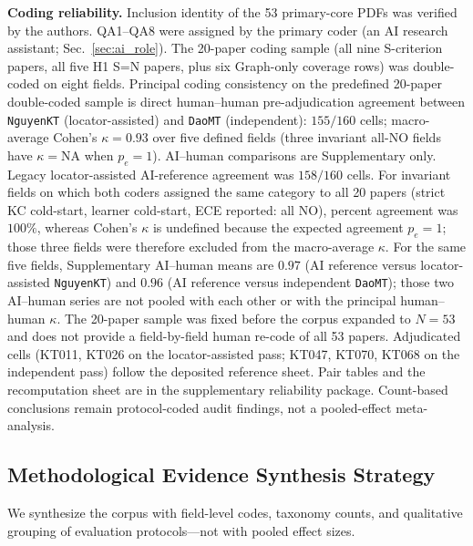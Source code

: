 \documentclass[lettersize,journal]{IEEEtran}
\begin{document}
\textbf{Coding reliability.} Inclusion identity of the 53 primary-core PDFs was verified by the authors. QA1--QA8 were assigned by the primary coder (an AI research assistant; Sec.~\ref{sec:ai_role}). The 20-paper coding sample (all nine S-criterion papers, all five H1 S=N papers, plus six Graph-only coverage rows) was double-coded on eight fields. Principal coding consistency on the predefined 20-paper double-coded sample is direct human--human pre-adjudication agreement between \texttt{NguyenKT} (locator-assisted) and \texttt{DaoMT} (independent): $155/160$ cells; macro-average Cohen's $\kappa=0.93$ over five defined fields (three invariant all-NO fields have $\kappa=\mathrm{NA}$ when $p_e=1$). AI--human comparisons are Supplementary only. Legacy locator-assisted AI-reference agreement was $158/160$ cells. For invariant fields on which both coders assigned the same category to all 20 papers (strict KC cold-start, learner cold-start, ECE reported: all NO), percent agreement was $100\%$, whereas Cohen's $\kappa$ is undefined because the expected agreement $p_e=1$; those three fields were therefore excluded from the macro-average $\kappa$. For the same five fields, Supplementary AI--human means are $0.97$ (AI reference versus locator-assisted \texttt{NguyenKT}) and $0.96$ (AI reference versus independent \texttt{DaoMT}); those two AI--human series are not pooled with each other or with the principal human--human $\kappa$. The 20-paper sample was fixed before the corpus expanded to $N=53$ and does not provide a field-by-field human re-code of all 53 papers. Adjudicated cells (KT011, KT026 on the locator-assisted pass; KT047, KT070, KT068 on the independent pass) follow the deposited reference sheet. Pair tables and the recomputation sheet are in the supplementary reliability package. Count-based conclusions remain protocol-coded audit findings, not a pooled-effect meta-analysis.

\subsection{Methodological Evidence Synthesis Strategy}
We synthesize the corpus with field-level codes, taxonomy counts, and qualitative grouping of evaluation protocols---not with pooled effect sizes.
\end{document}
